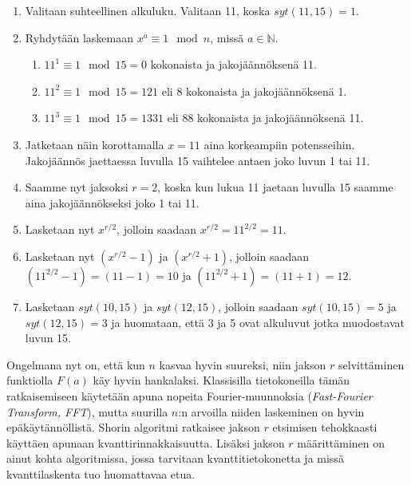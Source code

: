 \begin{enumerate}
    \item Valitaan suhteellinen alkuluku. Valitaan 11, koska $syt(11,15) = 1$.
    
    \item Ryhdytään laskemaan $x^{a} \equiv 1 \mod n$, missä $a \in \mathbb{N}$.
    
    \begin{enumerate}
    
        \item $11^{1} \equiv 1 \mod 15 = 0$ kokonaista ja jakojäännöksenä 11.
        
        \item $11^{2} \equiv 1 \mod 15 = 121$ eli 8 kokonaista ja jakojäännöksenä 1.
        
        \item $11^{3} \equiv 1 \mod 15 = 1331$ eli 88 kokonaista ja jakojäännöksenä 11.
    \end{enumerate}
    
    \item Jatketaan näin korottamalla $x = 11$ aina korkeampiin potensseihin. Jakojäännös jaettaessa luvulla 15 vaihtelee antaen joko luvun 1 tai 11.
    
    \item Saamme nyt jaksoksi $r = 2$, koska kun lukua 11 jaetaan luvulla 15 saamme aina jakojäännökseksi joko 1 tai 11.
    
    \item Lasketaan nyt $x^{r/2}$, jolloin saadaan $x^{r/2} = 11^{2/2} = 11$.
    
    \item Lasketaan nyt $(x^{r/2}-1)$ ja $(x^{r/2}+1)$, jolloin saadaan $(11^{2/2} - 1) = (11 - 1) = 10$ ja $(11^{2/2} + 1) = (11 + 1) = 12$.
    
    \item Lasketaan $syt(10,15)$ ja $syt(12,15)$, jolloin saadaan $syt(10,15) = 5$ ja $syt(12,15) = 3$ ja huomataan, että 3 ja 5 ovat alkuluvut jotka muodostavat luvun 15.
    
\end{enumerate}

Ongelmana nyt on, että kun $n$ kasvaa hyvin suureksi, niin jakson $r$ selvittäminen funktiolla $F(a)$ käy hyvin hankalaksi. Klassisilla tietokoneilla tämän ratkaisemiseen käytetään apuna nopeita Fourier-muunnoksia (\emph{Fast-Fourier Transform, FFT}), mutta suurilla $n$:n arvoilla niiden laskeminen on hyvin epäkäytännöllistä. Shorin algoritmi ratkaisee jakson $r$ etsimisen tehokkaasti käyttäen apunaan kvanttirinnakkaisuutta. Lisäksi jakson $r$ määrittäminen on ainut kohta algoritmissa, jossa tarvitaan kvanttitietokonetta ja missä kvanttilaskenta tuo huomattavaa etua.

